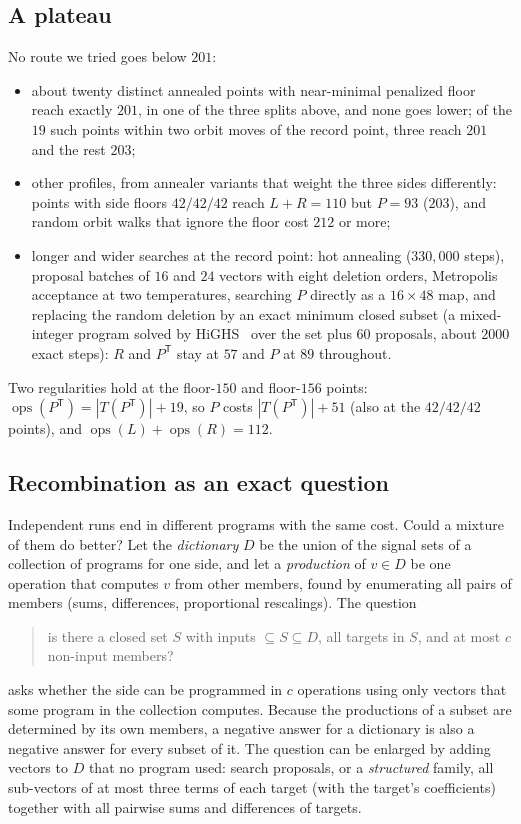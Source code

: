 \documentclass[11pt]{article}
\theoremstyle{remark}
\newcommand{\Pt}{P^{\mathsf T}}
\newcommand{\ops}{\operatorname{ops}}
\begin{document}
\subsection{A plateau}

No route we tried goes below $201$:
\begin{itemize}
\item about twenty distinct annealed points with near-minimal penalized
  floor reach exactly $201$, in one of the three splits above, and none
  goes lower; of the $19$ such points within two orbit moves of the
  record point, three reach $201$ and the rest $203$;
\item other profiles, from annealer variants that weight the three sides
  differently: points with side floors $42/42/42$ reach $L+R=110$ but
  $P=93$ ($203$), and random orbit walks that ignore the floor cost
  $212$ or more;
\item longer and wider searches at the record point: hot annealing
  ($330{,}000$ steps), proposal batches of $16$ and $24$ vectors with
  eight deletion orders, Metropolis acceptance at two temperatures,
  searching $P$ directly as a $16\times48$ map, and replacing the random
  deletion by an exact minimum closed subset (a mixed-integer program
  solved by HiGHS~\cite{HiGHS} over the set plus $60$ proposals, about
  $2000$ exact steps): $R$ and $\Pt$ stay at $57$ and $P$ at $89$
  throughout.
\end{itemize}
Two regularities hold at the floor-$150$ and floor-$156$ points:
$\ops(\Pt)=|T(\Pt)|+19$, so $P$ costs $|T(\Pt)|+51$ (also at the
$42/42/42$ points), and $\ops(L)+\ops(R)=112$.

\subsection{Recombination as an exact question}

Independent runs end in different programs with the same cost.  Could a
mixture of them do better?  Let the \emph{dictionary} $D$ be the union
of the signal sets of a collection of programs for one side, and let a
\emph{production} of $v\in D$ be one operation that computes $v$ from
other members, found by enumerating all pairs of members (sums,
differences, proportional rescalings).  The question
\begin{quote}
is there a closed set $S$ with inputs $\subseteq S\subseteq D$, all
targets in $S$, and at most $c$ non-input members?
\end{quote}
asks whether the side can be programmed in $c$ operations using only
vectors that some program in the collection computes.  Because the
productions of a subset are determined by its own members, a negative
answer for a dictionary is also a negative answer for every subset of
it.  The question can be enlarged by adding vectors to $D$ that no
program used: search proposals, or a \emph{structured} family, all
sub-vectors of at most three terms of each target (with the target's
coefficients) together with all pairwise sums and differences of
targets.
\end{document}
